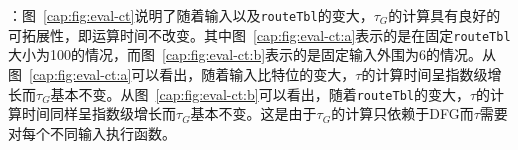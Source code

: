 ：图~\ref{cap:fig:eval-ct}说明了随着输入以及\texttt{routeTbl}的变大，$\tau_G$的计算具有良好的可拓展性，即运算时间不改变。其中图~\ref{cap:fig:eval-ct:a}表示的是在固定\texttt{routeTbl}大小为100的情况，而图~\ref{cap:fig:eval-ct:b}表示的是固定输入外围为6的情况。从图~\ref{cap:fig:eval-ct:a}可以看出，随着输入比特位的变大，$\tau$的计算时间呈指数级增长而$\tau_G$基本不变。从图~\ref{cap:fig:eval-ct:b}可以看出，随着\texttt{routeTbl}的变大，$\tau$的计算时间同样呈指数级增长而$\tau_G$基本不变。这是由于$\tau_G$的计算只依赖于DFG而$\tau$需要对每个不同输入执行函数。




